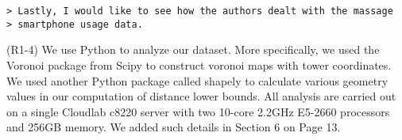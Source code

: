 \begin{verbatim}
> Lastly, I would like to see how the authors dealt with the massage
> smartphone usage data.
\end{verbatim}

(R1-4) We use Python to analyze our dataset. More specifically, we used the Voronoi package from Scipy to construct voronoi maps with tower coordinates. We used another Python package called shapely to calculate various geometry values in our computation of distance lower bounds. All analysis are carried out on a single Cloudlab c8220 server with two 10-core 2.2GHz E5-2660 processors and 256GB memory. 
We added such details in Section 6 on Page 13. 